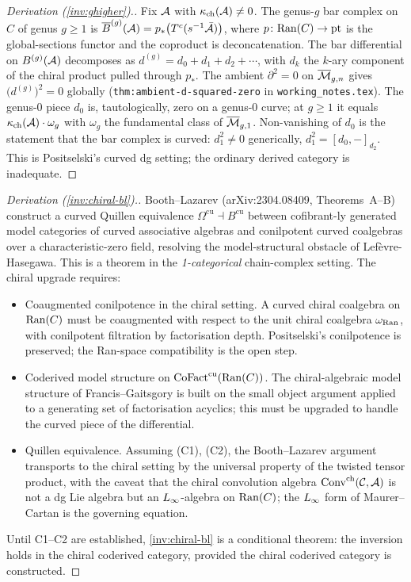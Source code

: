 \begin{proof}[Derivation (\ref{inv:ghigher}).]
Fix $\mathcal{A}$ with $\kappa_{\mathrm{ch}}(\mathcal{A}) \neq 0$. The genus-$g$ bar
complex on $C$ of genus $g \geq 1$ is
$\overline{B}^{(g)}(\mathcal{A}) = p_* \bigl(T^c(s^{-1}\bar{\mathcal{A}})\bigr)$, where
$p \colon \mathrm{Ran}(C) \to \mathrm{pt}$ is the global-sections functor
and the coproduct is deconcatenation. The bar differential on
$B^{(g)}(\mathcal{A})$ decomposes as
$d^{(g)} = d_0 + d_1 + d_2 + \cdots$, with $d_k$ the $k$-ary
component of the chiral product pulled through $p_*$. The
ambient $\partial^2 = 0$ on $\overline{\mathcal{M}}_{g,n}$ gives
$\bigl(d^{(g)}\bigr)^2 = 0$ globally (\texttt{thm:ambient-d-squared-zero}
in \texttt{working\_notes.tex}). The genus-$0$ piece $d_0$ is,
tautologically, zero on a genus-$0$ curve; at $g \geq 1$ it equals
$\kappa_{\mathrm{ch}}(\mathcal{A}) \cdot \omega_g$ with $\omega_g$ the fundamental class
of $\overline{\mathcal{M}}_{g,1}$.  Non-vanishing of $d_0$ is the statement
that the bar complex is curved: $d_1^2 \neq 0$ generically,
$d_1^2 = [d_0, -]_{d_2}$. This is Positselski's curved dg setting;
the ordinary derived category is inadequate.
\end{proof}

\begin{proof}[Derivation (\ref{inv:chiral-bl}).]
Booth--Lazarev (arXiv:2304.08409, Theorems~A--B) construct a
curved Quillen equivalence
$\Omega^{\mathrm{cu}} \dashv B^{\mathrm{cu}}$
between cofibrant-ly generated model categories of curved
associative algebras and conilpotent curved coalgebras over a
characteristic-zero field, resolving the model-structural obstacle
of Lef\`evre-Hasegawa. This is a theorem in the \emph{1-categorical}
chain-complex setting. The chiral upgrade requires:
\begin{itemize}
\item[(C1)] Coaugmented conilpotence in the chiral setting. A
curved chiral coalgebra on $\mathrm{Ran}(C)$ must be coaugmented with
respect to the unit chiral coalgebra $\omega_{\mathrm{Ran}}$, with
conilpotent filtration by factorisation depth. Positselski's
conilpotence is preserved; the Ran-space compatibility is the
open step.

\item[(C2)] Coderived model structure on
$\mathrm{CoFact}^{\mathrm{cu}}(\mathrm{Ran}(C))$. The chiral-algebraic
model structure of Francis--Gaitsgory is built on the small object
argument applied to a generating set of factorisation acyclics;
this must be upgraded to handle the curved piece of the
differential.

\item[(C3)] Quillen equivalence.  Assuming (C1), (C2), the
Booth--Lazarev argument transports to the chiral setting by the
universal property of the twisted tensor product, with the
caveat that the chiral convolution algebra
$\mathrm{Conv}^{\mathrm{ch}}(\mathcal{C}, \mathcal{A})$ is not a dg Lie algebra but an
$L_\infty$-algebra on $\mathrm{Ran}(C)$; the $L_\infty$ form of
Maurer--Cartan is the governing equation.
\end{itemize}
Until C1--C2 are established, \ref{inv:chiral-bl} is a
conditional theorem: the inversion holds in the chiral
coderived category, provided the chiral coderived category is
constructed.
\end{proof}

